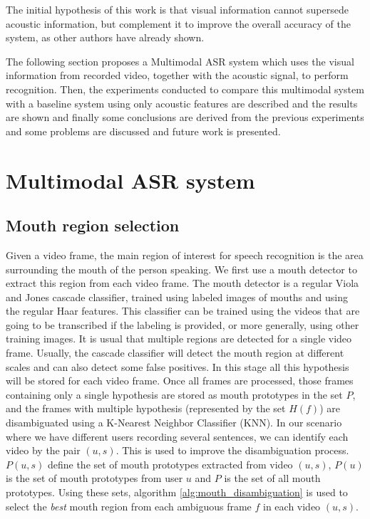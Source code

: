 \documentclass[12pt,a4paper]{article}
\begin{document}
The initial hypothesis of this work is that visual information cannot supersede acoustic information, but complement it to improve the overall accuracy of the system, as other authors have already shown.

The following section proposes a Multimodal ASR system which uses the visual information from recorded video, together with the acoustic signal, to perform recognition. Then, the experiments conducted to compare this multimodal system with a baseline system using only acoustic features are described and the results are shown and finally some conclusions are derived from the previous experiments and some problems are discussed and future work is presented.

\section{Multimodal ASR system}
\subsection{Mouth region selection}
Given a video frame, the main region of interest for speech recognition is the area surrounding the mouth of the person speaking. We first use a mouth detector to extract this region from each video frame. The mouth detector is a regular Viola and Jones\cite{viola2001rapid} cascade classifier, trained using labeled images of mouths and using the regular Haar features\cite{papageorgiou1998general}. This classifier can be trained using the videos that are going to be transcribed if the labeling is provided, or more generally, using other training images. It is usual that multiple regions are detected for a single video frame. Usually, the cascade classifier will detect the mouth region at different scales and can also detect some false positives. In this stage all this hypothesis will be stored for each video frame. Once all frames are processed, those frames containing only a single hypothesis are stored as mouth prototypes in the set $P$, and the frames with multiple hypothesis (represented by the set $H(f)$) are disambiguated using a K-Nearest Neighbor Classifier (KNN).
In our scenario where we have different users recording several sentences, we can identify each video by the pair $(u,s)$. This is used to improve the disambiguation process. $P(u,s)$ define the set of mouth prototypes extracted from video $(u,s)$, $P(u)$ is the set of mouth prototypes from user $u$ and $P$ is the set of all mouth prototypes. Using these sets, algorithm \ref{alg:mouth_disambiguation} is used to select the \emph{best} mouth region from each ambiguous frame $f$ in each video $(u,s)$.
\end{document}
